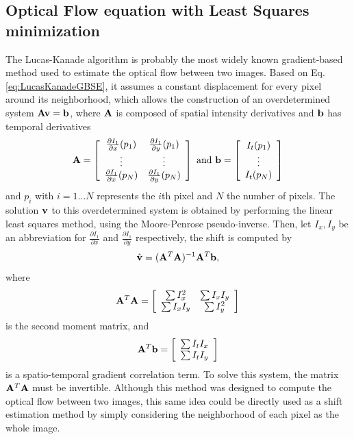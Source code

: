 \subsection{Optical Flow equation with Least Squares minimization}
\label{sec:LSMinimization}
The Lucas-Kanade algorithm \cite{Lucas_1981} is probably the most widely known gradient-based method used to estimate the optical flow between two images. Based on Eq. \eqref{eq:LucasKanadeGBSE}, it assumes a constant displacement for every pixel around its neighborhood, which allows the construction of an overdetermined system $\mathbf{A}\mathbf{v} = \mathbf{b}$, where $\mathbf{A}$ is composed of spatial intensity derivatives and $\mathbf{b}$ has temporal derivatives
\begin{equation}
\label{eq:opflowEqChapter1}
\bA = \left[
\begin{array}[h!]{cc}
\frac{\partial I_1}{\partial x}(p_1) & \frac{\partial I_1}{\partial y}(p_1) \\
\vdots & \vdots \\
\frac{\partial I_1}{\partial x}(p_N) & \frac{\partial I_1}{\partial y}(p_N) 
\end{array}
\right] \text{ and }
\bb = \left[
\begin{array}[h!]{c}
I_t(p_1) \\
\vdots \\
I_t(p_N)
\end{array}
\right]
\end{equation}
and $p_i$ with $i = 1 \dots N$ represents the $i$th pixel and $N$ the number of pixels. The solution $\mathbf{v}$ to this overdetermined system is obtained by performing the linear least squares method, using the Moore-Penrose pseudo-inverse. Then, let $I_x, I_y$ be an abbreviation for 
$\frac{\partial I_1}{\partial x}$ and $\frac{\partial I_1}{\partial y}$ respectively, the shift is computed by
\begin{equation}
\hat{\mathbf{v}} = (\mathbf{A}^T\mathbf{A})^{-1}\mathbf{A}^T\mathbf{b},
\label{eq:lukasKanadeSolutionChapter1}
\end{equation}
where 
\begin{equation}
\mathbf{A}^T\mathbf{A} = \left[\begin{array}{c c}
\sum I_x^2 & \sum I_xI_y \\
\sum I_xI_y & \sum I_y^2
\end{array}\right]	
\end{equation}
is the second moment matrix, and
\begin{equation}
\mathbf{A}^T\mathbf{b} = \left[
\begin{array}{c c}
\sum I_tI_x \\ 
\sum I_tI_y
\end{array} \right]
\end{equation}
 is a spatio-temporal gradient correlation term. To solve this system, the matrix $\mathbf{A}^T\mathbf{A}$ must be invertible. Although this method was designed to compute the optical flow between two images, this same idea could be directly used as a shift estimation method by simply considering the neighborhood of each pixel as the whole image.


